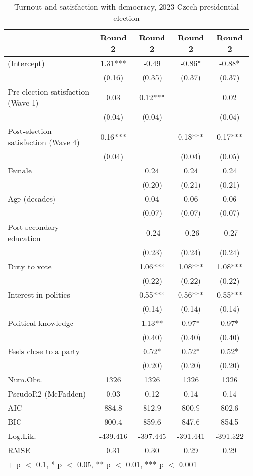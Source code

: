 \begin{table}

\caption{\label{tab:unnamed-chunk-2}Turnout and satisfaction with democracy, 2023 Czech presidential election}
\centering
\begin{tabular}[t]{lcccc}
\toprule
  & Round 2 & Round 2  & Round 2   & Round 2   \\
\midrule
(Intercept) & 1.31*** & -0.49 & -0.86* & -0.88*\\
 & (0.16) & (0.35) & (0.37) & (0.37)\\
Pre-election satisfaction (Wave 1) & 0.03 & 0.12*** &  & 0.02\\
 & (0.04) & (0.04) &  & (0.04)\\
Post-election satisfaction (Wave 4) & 0.16*** &  & 0.18*** & 0.17***\\
 & (0.04) &  & (0.04) & (0.05)\\
Female &  & 0.24 & 0.24 & 0.24\\
 &  & (0.20) & (0.21) & (0.21)\\
Age (decades) &  & 0.04 & 0.06 & 0.06\\
 &  & (0.07) & (0.07) & (0.07)\\
Post-secondary education &  & -0.24 & -0.26 & -0.27\\
 &  & (0.23) & (0.24) & (0.24)\\
Duty to vote &  & 1.06*** & 1.08*** & 1.08***\\
 &  & (0.22) & (0.22) & (0.22)\\
Interest in politics &  & 0.55*** & 0.56*** & 0.55***\\
 &  & (0.14) & (0.14) & (0.14)\\
Political knowledge &  & 1.13** & 0.97* & 0.97*\\
 &  & (0.40) & (0.40) & (0.40)\\
Feels close to a party &  & 0.52* & 0.52* & 0.52*\\
 &  & (0.20) & (0.20) & (0.20)\\
\midrule
Num.Obs. & 1326 & 1326 & 1326 & 1326\\
PseudoR2 (McFadden) & 0.03 & 0.12 & 0.14 & 0.14\\
AIC & 884.8 & 812.9 & 800.9 & 802.6\\
BIC & 900.4 & 859.6 & 847.6 & 854.5\\
Log.Lik. & -439.416 & -397.445 & -391.441 & -391.322\\
RMSE & 0.31 & 0.30 & 0.29 & 0.29\\
\bottomrule
\multicolumn{5}{l}{\rule{0pt}{1em}+ p $<$ 0.1, * p $<$ 0.05, ** p $<$ 0.01, *** p $<$ 0.001}\\
\end{tabular}
\end{table}
